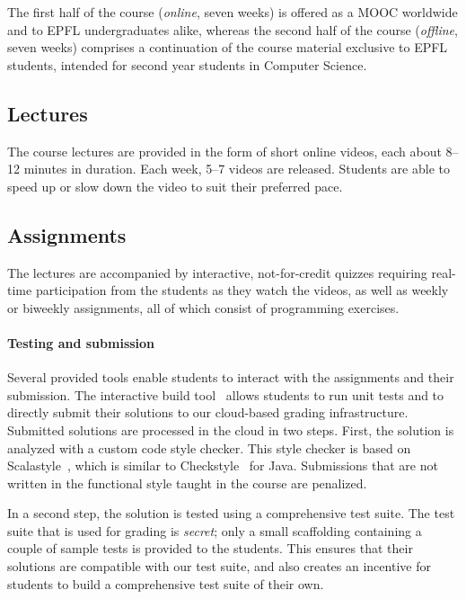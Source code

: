 \documentclass{sig-alternate}
\begin{document}
The first half of the course ({\em online}, seven weeks) is offered as a MOOC worldwide and to EPFL undergraduates alike, whereas the second half of the course ({\em offline}, seven weeks) comprises a continuation of the course material exclusive to EPFL students, intended for second year students in Computer Science.

\subsection{Lectures}\label{sec:mooc-elements}

The course lectures are provided in the form of short
online videos, each about 8--12 minutes in duration. Each week, 5--7
videos are released.
Students are able to speed up or slow down the video to suit their preferred pace.

\subsection{Assignments}

The lectures are accompanied by interactive, not-for-credit
quizzes requiring real-time participation from the students as they watch the videos, as well as weekly or biweekly assignments, all of which
consist of programming exercises.

\paragraph{Testing and submission}
Several provided tools enable students to
interact with the assignments and their submission. The
interactive build tool~\cite{sbt} allows students to run unit tests and to
directly submit their solutions to our cloud-based grading infrastructure.
Submitted solutions are processed in the cloud in two steps. First, the
solution is analyzed with a custom code style checker. This style checker is based
on Scalastyle~\cite{ScalaStyle}, which is similar to
Checkstyle~\cite{Ware08} for Java. Submissions that are not written in the
functional style taught in the course are penalized.

In a second step,
the solution is tested using a comprehensive test suite.
The test suite that is used for grading is {\em secret}; only a small
scaffolding containing a couple of sample tests is provided to the students.
This ensures that their solutions are compatible with our test suite, and
also creates an incentive for students to build a comprehensive test
suite of their own.
\end{document}

